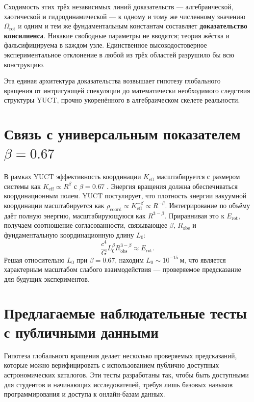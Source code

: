 \documentclass[11pt,a4paper]{article}
\newcommand{\Keff}{K_{\mathrm{eff}}}
\begin{document}
	Сходимость этих трёх независимых линий доказательств — алгебраической, хаотической и гидродинамической — к одному и тому же численному значению \(\Omega_{\mathrm{rot}}\) и одним и тем же фундаментальным константам составляет \textbf{доказательство консилиенса}. Никакие свободные параметры не вводятся; теория жёстка и фальсифицируема в каждом узле. Единственное высокодостоверное экспериментальное отклонение в любой из трёх областей разрушило бы всю конструкцию.
	
	Эта единая архитектура доказательства возвышает гипотезу глобального вращения от интригующей спекуляции до математически необходимого следствия структуры YUCT, прочно укоренённого в алгебраическом скелете реальности.
	
	\section{Связь с универсальным показателем \(\beta = 0.67\)}
	
	В рамках YUCT эффективность координации \(\Keff\) масштабируется с размером системы как \(\Keff \propto R^{\beta}\) с \(\beta = 0.67\) \cite{AppendixL}. Энергия вращения должна обеспечиваться координационным полем. YUCT постулирует, что плотность энергии вакуумной координации масштабируется как \(\rho_{\text{coord}} \propto \Keff^{-\beta} \propto R^{-\beta}\). Интегрирование по объёму даёт полную энергию, масштабирующуюся как \(R^{3-\beta}\). Приравнивая это к \(E_{\text{rot}}\), получаем соотношение согласованности, связывающее \(\beta\), \(R_{\text{obs}}\) и фундаментальную координационную длину \(L_0\):
	\begin{equation}
		\frac{c^4}{G} L_0^{\beta} R_{\text{obs}}^{3-\beta} \approx E_{\text{rot}}.
	\end{equation}
	Решая относительно \(L_0\) при \(\beta = 0.67\), находим \(L_0 \sim 10^{-15}\ \text{м}\), что является характерным масштабом слабого взаимодействия — проверяемое предсказание для будущих экспериментов.
	
	\section{Предлагаемые наблюдательные тесты с публичными данными}
	
	Гипотеза глобального вращения делает несколько проверяемых предсказаний, которые можно верифицировать с использованием публично доступных астрономических каталогов. Эти тесты разработаны так, чтобы быть доступными для студентов и начинающих исследователей, требуя лишь базовых навыков программирования и доступа к онлайн-базам данных.
	
\end{document}
